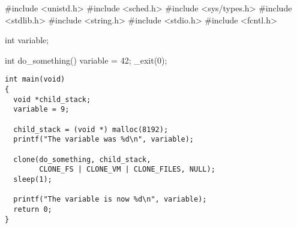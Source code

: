 \documentclass[varwidth=38em,crop]{standalone}
\begin{document}
\begin{minipage}{.32\linewidth}
\begin{ccode}
#include <unistd.h> 
#include <sched.h> 
#include <sys/types.h> 
#include <stdlib.h> 
#include <string.h> 
#include <stdio.h> 
#include <fcntl.h>
 
int variable;
 
int do_something()
{
  variable = 42;
  _exit(0);
}
\end{ccode}  
\end{minipage}\hfill
\begin{minipage}{.65\linewidth}
\begin{verbatim}
int main(void)
{
  void *child_stack;
  variable = 9;

  child_stack = (void *) malloc(8192);
  printf("The variable was %d\n", variable);
   
  clone(do_something, child_stack,
        CLONE_FS | CLONE_VM | CLONE_FILES, NULL);
  sleep(1);
 
  printf("The variable is now %d\n", variable);
  return 0;
}
\end{verbatim}
\end{minipage}
\end{document}
